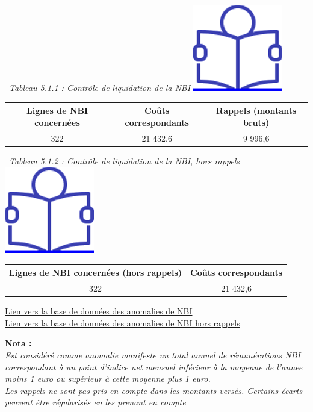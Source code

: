 ~\emph{Tableau 5.1.1 : Contrôle de liquidation de la NBI}
\href{../Docs/Notices/fiche_NBI_liq.odt}{\includegraphics{icones/Notice.png}}

\begin{longtable}[]{@{}ccc@{}}
\toprule
Lignes de NBI concernées & Coûts correspondants & Rappels (montants
bruts)\tabularnewline
\midrule
\endhead
322 & 21 432,6 & 9 996,6\tabularnewline
\bottomrule
\end{longtable}

~\emph{Tableau 5.1.2 : Contrôle de liquidation de la NBI, hors rappels}
~
\href{../Docs/Notices/fiche_NBI_liq.odt}{\includegraphics{icones/Notice.png}}

\begin{longtable}[]{@{}cc@{}}
\toprule
Lignes de NBI concernées (hors rappels) & Coûts
correspondants\tabularnewline
\midrule
\endhead
322 & 21 432,6\tabularnewline
\bottomrule
\end{longtable}

\href{../Bases/Fiabilite/lignes.nbi.anormales.csv}{Lien vers la base de
données des anomalies de NBI}\\
\href{../Bases/Fiabilite/lignes.nbi.anormales.hors.rappels.csv}{Lien vers
la base de données des anomalies de NBI hors rappels}

\textbf{Nota :}\\
\emph{Est considéré comme anomalie manifeste un total annuel de
rémunérations NBI correspondant à un point d'indice net mensuel
inférieur à la moyenne de l'annee moins 1 euro ou supérieur à cette
moyenne plus 1 euro.}\\
\emph{Les rappels ne sont pas pris en compte dans les montants versés.
Certains écarts peuvent être régularisés en les prenant en compte}

